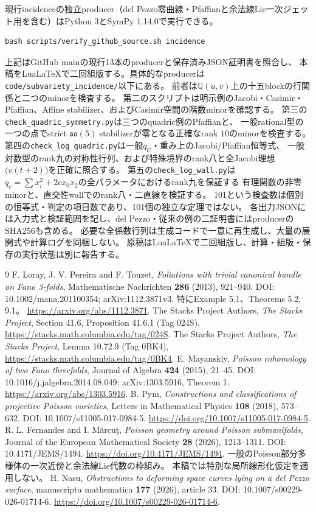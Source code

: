 \documentclass[a4paper,11pt]{ltjsarticle}
\theoremstyle{definition}
\theoremstyle{definition}\newtheorem{definition}[theorem]{定義}
\theoremstyle{remark}\newtheorem{remark}[theorem]{注意}
\begin{document}
現行incidenceの独立producer（del Pezzo零曲線・Pfaffianと余法線Lie一次ジェット用を含む）はPython 3とSymPy 1.14.0で実行できる。
\begin{verbatim}
bash scripts/verify_github_source.sh incidence
\end{verbatim}
上記はGitHub mainの現行13本のproducerと保存済みJSON証明書を照合し、
本稿をLuaLaTeXで二回組版する。具体的なproducerは
\texttt{code/subvariety\_incidence/}以下にある。
前者は$\mathbb Q(u,v)$上の十五blockの行関係と二つのminorを検査する。
第二のスクリプトは明示例のJacobi・Casimir・Pfaffian、Affine stabilizer、およびCasimir空間の階数minorを確認する。
第三の\texttt{check\_quadric\_symmetry.py}は三つのquadric例のPfaffianと、
一般rational型の一つの点でstrict $\mathfrak{so}(5)$ stabilizerが零となる正確なrank $10$のminorを検査する。
第四の\texttt{check\_log\_quadric.py}は一般$q_U$・重み上のJacobi/Pfaffian恒等式、
一般対数型のrank九の対称性行列、および特殊境界のrank八と全Jacobi理想$\bigl(v(t+2)\bigr)$を正確に照合する。
第五の\texttt{check\_log\_wall.py}は
$q_c=\sum x_i^2+2cx_0x_2$の全パラメータにおけるrank九を保証する
有理関数の非零minorと、直交性wallでのrank八・二直線を検証する。
101という検査数は個別の恒等式・判定の項目数であり、101個の独立な定理ではない。
各出力JSONには入力式と検証範囲を記し、del Pezzo・従来の例の二証明書にはproducerのSHA256も含める。
必要な全係数行列は生成コードで一意に再生成し、大量の展開式や計算ログを同梱しない。
原稿はLuaLaTeXで二回組版し、計算・組版・保存の実行状態は別に報告する。

\begin{thebibliography}{9}
 F. Loray, J. V. Pereira and F. Touzet,
\emph{Foliations with trivial canonical bundle on Fano 3-folds},
Mathematische Nachrichten \textbf{286} (2013), 921--940.
DOI: 10.1002/mana.201100354; arXiv:1112.3871v3.
特にExample 5.1、Theorems 5.2, 9.1。
\url{https://arxiv.org/abs/1112.3871}.
 The Stacks Project Authors,
\emph{The Stacks Project}, Section 41.6, Proposition 41.6.1 (Tag 024S),
\url{https://stacks.math.columbia.edu/tag/024S}.
 The Stacks Project Authors,
\emph{The Stacks Project}, Lemma 10.72.9 (Tag 0BK4),
\url{https://stacks.math.columbia.edu/tag/0BK4}.
 E. Mayanskiy, \emph{Poisson cohomology of two Fano threefolds},
Journal of Algebra \textbf{424} (2015), 21--45.
DOI: 10.1016/j.jalgebra.2014.08.049; arXiv:1303.5916, Theorem 1.
\url{https://arxiv.org/abs/1303.5916}.
 B. Pym,
\emph{Constructions and classifications of projective Poisson varieties},
Letters in Mathematical Physics \textbf{108} (2018), 573--632.
DOI: 10.1007/s11005-017-0984-5.
\url{https://doi.org/10.1007/s11005-017-0984-5}.
 R. L. Fernandes and I. M\u{a}rcu\c{t},
\emph{Poisson geometry around Poisson submanifolds},
Journal of the European Mathematical Society \textbf{28} (2026), 1213--1311.
DOI: 10.4171/JEMS/1494.
\url{https://doi.org/10.4171/JEMS/1494}.
一般のPoisson部分多様体の一次近傍と余法線Lie代数の枠組み。
本稿では特別な局所線形化仮定を適用しない。
 H. Nasu,
\emph{Obstructions to deforming space curves lying on a del Pezzo surface},
manuscripta mathematica \textbf{177} (2026), article 33.
DOI: 10.1007/s00229-026-01714-6.
\url{https://doi.org/10.1007/s00229-026-01714-6}.
\end{thebibliography}
\end{document}
